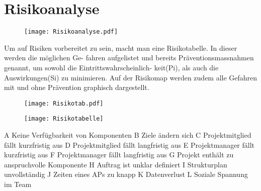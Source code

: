 \section{Risikoanalyse}
\begin{figure}[H]
	\centering
	\texttt{[image: Risikoanalyse.pdf]}
	\label{fig:Risikoanalyse}
\end{figure}

\newpage

Um auf Risiken vorbereitet zu sein, macht man eine Risikotabelle. In dieser werden die möglichen Ge- fahren aufgelistet und bereits Präventionsmassnahmen genannt, um sowohl die Eintrittswahrscheinlich- keit(Pi), als auch die Auswirkungen(Si) zu minimieren. Auf der Risikomap werden zudem alle Gefahren mit und ohne Prävention graphisch dargestellt.

\begin{figure}[H]
	\centering
	\texttt{[image: Risikotab.pdf]}
	\label{fig:Risikodiagramm}
\end{figure}

\begin{figure}[H]
	\centering
	\texttt{[image: Risikotabelle]}
	\label{fig:Tabelle}
\end{figure}
A Keine Verfügbarkeit von Komponenten
B Ziele ändern sich
C Projektmitglied fällt kurzfristig aus
D Projektmitglied fällt langfristig aus
E Projektmanager fällt kurzfristig aus
F Projektmanager fällt langfristig aus
G Projekt enthält zu anspruchvolle Komponente
H Auftrag ist unklar definiert
I Strukturplan unvollständig
J Zeiten eines APs zu knapp
K Datenverlust
L Soziale Spannung im Team
